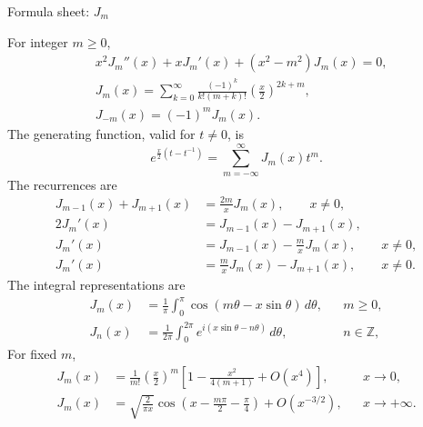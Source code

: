 \documentclass[11pt]{beamer}
\begin{document}
\begin{frame}[allowframebreaks=1.00]{Formula sheet: $J_m$}
\footnotesize

For integer $m\ge0$,
\begin{align*}
  &x^2J_m''(x)+xJ_m'(x)+(x^2-m^2)J_m(x)=0,\\[3pt]
  &J_m(x)=\sum_{k=0}^{\infty}
  \frac{(-1)^k}{k!(m+k)!}\left(\frac{x}{2}\right)^{2k+m},\\[3pt]
  &J_{-m}(x)=(-1)^mJ_m(x).
\end{align*}
The generating function, valid for $t\ne0$, is
\[
  e^{\frac{x}{2}(t-t^{-1})}
  =\sum_{m=-\infty}^{\infty}J_m(x)t^m.
\]
The recurrences are
\begin{align*}
  J_{m-1}(x)+J_{m+1}(x)&=\frac{2m}{x}J_m(x),\qquad x\ne0,\\
  2J_m'(x)&=J_{m-1}(x)-J_{m+1}(x),\\
  J_m'(x)&=J_{m-1}(x)-\frac{m}{x}J_m(x),\qquad x\ne0,\\
  J_m'(x)&=\frac{m}{x}J_m(x)-J_{m+1}(x),\qquad x\ne0.
\end{align*}
The integral representations are
\begin{align*}
  J_m(x)&=\frac{1}{\pi}\int_0^\pi
  \cos(m\theta-x\sin\theta)\,d\theta,
  &&m\ge0,\\
  J_n(x)&=\frac{1}{2\pi}\int_0^{2\pi}
  e^{i(x\sin\theta-n\theta)}\,d\theta,
  &&n\in\mathbb Z,
\end{align*}
For fixed $m$,
\begin{align*}
  J_m(x)
  &=\frac{1}{m!}\left(\frac{x}{2}\right)^m
  \left[1-\frac{x^2}{4(m+1)}+O(x^4)\right],
  &&x\to0,\\
  J_m(x)
  &=\sqrt{\frac{2}{\pi x}}
  \cos\left(x-\frac{m\pi}{2}-\frac{\pi}{4}\right)
  +O(x^{-3/2}),
  &&x\to+\infty.
\end{align*}
\end{frame}
\end{document}
